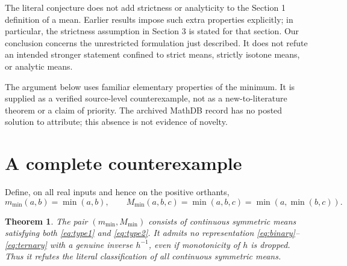 \documentclass[11pt]{article}
\newtheorem{theorem}{Theorem}
\begin{document}
The literal conjecture does not add strictness or analyticity to the Section 1 definition of a mean. Earlier results impose such extra properties explicitly; in particular, the strictness assumption in Section 3 is stated for that section. Our conclusion concerns the unrestricted formulation just described. It does not refute an intended stronger statement confined to strict means, strictly isotone means, or analytic means.

The argument below uses familiar elementary properties of the minimum. It is supplied as a verified source-level counterexample, not as a new-to-literature theorem or a claim of priority. The archived MathDB record has no posted solution to attribute; this absence is not evidence of novelty.

\section{A complete counterexample}
Define, on all real inputs and hence on the positive orthants,
\[
 m_{\min}(a,b)=\min(a,b),\qquad
 M_{\min}(a,b,c)=\min(a,b,c)=\min(a,\min(b,c)).
\]
\begin{theorem}\label{thm:main}
The pair $(m_{\min},M_{\min})$ consists of continuous symmetric means satisfying both \eqref{eq:type1} and \eqref{eq:type2}. It admits no representation \eqref{eq:binary}--\eqref{eq:ternary} with a genuine inverse $h^{-1}$, even if monotonicity of $h$ is dropped. Thus it refutes the literal classification of all continuous symmetric means.
\end{theorem}
\end{document}
